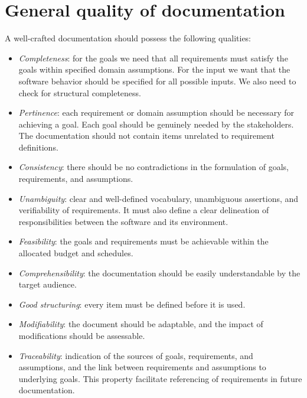 \section{General quality of documentation}

A well-crafted documentation should possess the following qualities:
\begin{itemize}
    \item \textit{Completeness}: for the goals we need that all requirements must satisfy the goals within specified domain assumptions.
        For the input we want that the software behavior should be specified for all possible inputs.
        We also need to check for structural completeness. 
    \item \textit{Pertinence}: each requirement or domain assumption should be necessary for achieving a goal.
        Each goal should be genuinely needed by the stakeholders.
        The documentation should not contain items unrelated to requirement definitions.
    \item \textit{Consistency}: there should be no contradictions in the formulation of goals, requirements, and assumptions.
    \item \textit{Unambiguity}: clear and well-defined vocabulary, unambiguous assertions, and verifiability of requirements.
        It must also define a clear delineation of responsibilities between the software and its environment.
    \item \textit{Feasibility}: the goals and requirements must be achievable within the allocated budget and schedules.
    \item \textit{Comprehensibility}: the documentation should be easily understandable by the target audience.
    \item \textit{Good structuring}: every item must be defined before it is used.
    \item \textit{Modifiability}: the document should be adaptable, and the impact of modifications should be assessable.
    \item \textit{Traceability}: indication of the sources of goals, requirements, and assumptions, and the link between requirements and assumptions to underlying goals.
        This property facilitate referencing of requirements in future documentation.
\end{itemize}   